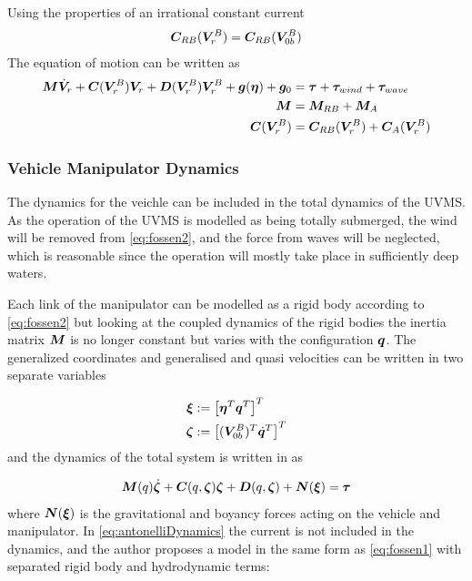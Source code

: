 Using the properties of an irrational constant current \cite{fs} 
\begin{align}
  \boldsymbol C_{RB}(\boldsymbol V_{r}^B) &= \boldsymbol C_{RB}(\boldsymbol V_{0b}^B) 
  \label{eq:irrational}\\
\end{align}
The equation of motion can be written as 
\begin{align}
  \boldsymbol M \dot{\boldsymbol V}_r + \boldsymbol C(\boldsymbol V_{r}^B)\boldsymbol V_r + \boldsymbol D(\boldsymbol V_{r}^B)\boldsymbol V_{r}^B +  \boldsymbol g(\boldsymbol \eta) + \boldsymbol g_0  &= \boldsymbol \tau + \boldsymbol \tau_{wind} + \boldsymbol \tau_{wave} 
  \label{eq:fossen2}\\
  \boldsymbol M &= \boldsymbol M_{RB} + \boldsymbol M_A
  \label{eq:massCol} \\
  \boldsymbol C(\boldsymbol V_r^B) &= \boldsymbol C_{RB}(\boldsymbol V_r^B)+ \boldsymbol C_A(\boldsymbol V_r^B)
\end{align}


\subsubsection{Vehicle Manipulator Dynamics}
The dynamics for the veichle can be included in the total dynamics of the UVMS. As the operation of the UVMS is modelled as being totally submerged, the wind will be removed from \eqref{eq:fossen2}, and the force from waves will be neglected, which is reasonable since the operation will mostly take place in sufficiently deep waters.

Each link of the manipulator can be modelled as a rigid body according to \eqref{eq:fossen2} but looking at the coupled dynamics of the rigid bodies the inertia matrix $\boldsymbol M$ is no longer constant but varies with the configuration $\boldsymbol q$. The generalized coordinates and generalised and quasi velocities can be written in two separate variables

\begin{align}
  \boldsymbol \xi  & := \left[ \boldsymbol \eta^T \boldsymbol q^T \right]^T
  \label{eq:xi} \\
  \boldsymbol \zeta & := \left[ (\boldsymbol V_{0b}^B)^T \dot{\boldsymbol q}^T \right]^T
  \label{eq:zeta}
\end{align}
and the dynamics of the total system is written in \cite{antonelli1} as

\begin{align}
  \boldsymbol M(q)\dot{\boldsymbol \zeta} + \boldsymbol C(q,\boldsymbol \zeta) \boldsymbol \zeta +\boldsymbol D(q,\boldsymbol \zeta) + \boldsymbol N(\boldsymbol \xi)=\boldsymbol \tau
  \label{eq:antonelliDynamics}
\end{align}
where $\boldsymbol N(\boldsymbol \xi)$ is the gravitational and boyancy forces acting on the vehicle and manipulator. In \eqref{eq:antonelliDynamics} the current is not included in the dynamics, and the author proposes a model in the same form as \eqref{eq:fossen1} with separated rigid body and hydrodynamic terms:

